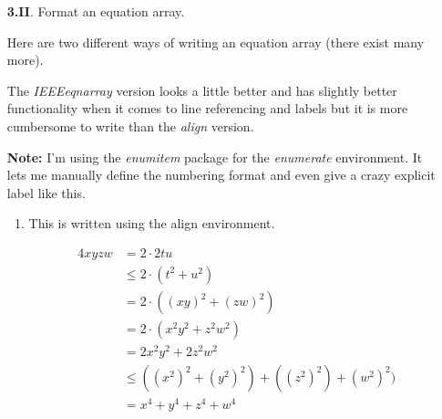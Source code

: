 \begin{enumerate}
\begin{proof}
        Therefore the basis is proven.

        \textit{Inductive step:} Let $k\in\mathbb{N}$ be an arbitrary integer. Suppose the following statement
        \begin{addmargin}{1cm}
          \textit{Inductive hypothesis:} $f(k)\leq f(k+1)$.
        \end{addmargin}
        in order to prove the following statement
        \begin{addmargin}{1cm}
          \textit{Inductive claim:} $f((k+1))\leq f((k+1)+1)$.
        \end{addmargin}

        Do things.

        This proves the inductive claim and completes the inductive step.

        The basis together with the inductive step prove our original claim by induction thus completing the proof.
        \end{proof}

      \qspace

      \item[\textbf{3.II}.]
        Format an equation array.

        \aspace

        Here are two different ways of writing an equation array (there exist many more).

        The \textit{IEEEeqnarray} version looks a little better and has slightly better functionality when it comes to line referencing and labels but it is more cumbersome to write than the \textit{align} version.

        \textbf{Note:} I'm using the \textit{enumitem} package for the \textit{enumerate} environment. It lets me manually define the numbering format and even give a crazy explicit label like this.

        \begin{enumerate}[label = --\alph*--$>$]

        \item
          This is written using the align environment.

          \begin{align*}
            4xyzw
            &= 2\cdot2tu \\
            &\le 2\cdot(t^2+u^2)                    \tag{a remark in parentheses} \\
            &= 2\cdot((xy)^2+(zw)^2) \\
            &= 2\cdot(x^2y^2+z^2w^2)                \tag*{a remark without parentheses} \\
            &= 2x^2y^2+2z^2w^2 \\
            &\le ((x^2)^2+(y^2)^2)+((z^2)^2)+(w^2)^2) \\
            &= x^4+y^4+z^4+w^4
          \end{align*}


\end{enumerate}
\end{enumerate}
